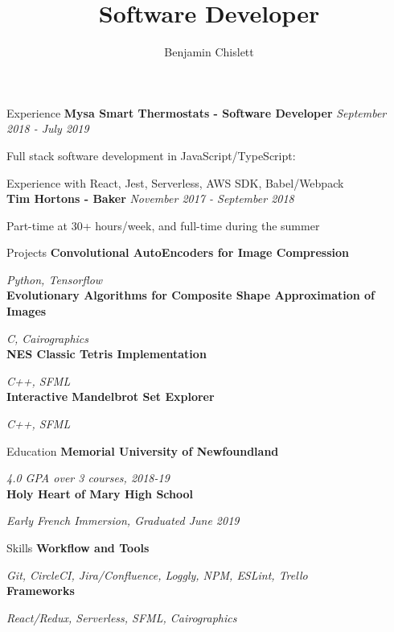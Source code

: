 \documentclass[11pt, letterpaper]{article}
\title{Software Developer}
\author{Benjamin Chislett}
\date{}
\begin{document}
\begin{center}
  \Huge\theauthor
  \par
  \huge\thetitle
  \par
\end{center}

\begin{section}{Experience}
\textbf{Mysa Smart Thermostats - Software Developer}
\textit{September 2018 - July 2019}

Full stack software development in JavaScript/TypeScript:

Experience with React, Jest, Serverless, AWS SDK, Babel/Webpack\\

\textbf{Tim Hortons - Baker}
\textit{November 2017 - September 2018}

Part-time at 30+ hours/week, and full-time during the summer
\end{section}

\begin{section}{Projects}
\textbf{Convolutional AutoEncoders for Image Compression}

\textit{Python, Tensorflow}\\

\textbf{Evolutionary Algorithms for Composite Shape Approximation of Images}

\textit{C, Cairographics}\\

\textbf{NES Classic Tetris Implementation}

\textit{C++, SFML}\\

\textbf{Interactive Mandelbrot Set Explorer}

\textit{C++, SFML}
\end{section}

\begin{section}{Education}
\textbf{Memorial University of Newfoundland}

\textit{4.0 GPA over 3 courses, 2018-19}\\

\textbf{Holy Heart of Mary High School}

\textit{Early French Immersion, Graduated June 2019}
\end{section}

\begin{section}{Skills}
\textbf{Workflow and Tools}

\textit{Git, CircleCI, Jira/Confluence, Loggly, NPM, ESLint, Trello}\\

\textbf{Frameworks}

\textit{React/Redux, Serverless, SFML, Cairographics}
\end{section}
\end{document}
